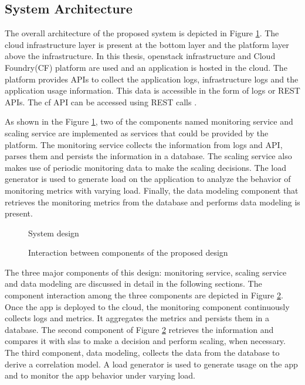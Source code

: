 \documentclass[article,type=msc,colorback,12pt,accentcolor=tud8b,table]{tudthesis}
\begin{document}
\subsection{System Architecture} 

	The overall architecture of the proposed system is depicted in Figure \ref{fig:system_design}. The cloud infrastructure layer is present at the bottom layer and the platform layer above the infrastructure. In this thesis, openstack infrastructure and Cloud Foundry(CF) platform are used and an application is hosted in the cloud. The platform provides APIs to collect the application logs, infrastructure logs and the application usage information. This data is accessible in the form of logs or REST APIs. The \gls{cf} API can be accessed using REST calls \cite{cf_summary}. 
	
	As shown in the Figure \ref{fig:system_design}, two of the components named monitoring service and scaling service are implemented as services that could be provided by the platform. The monitoring service collects the information from logs and API, parses them and persists the information in a database. The scaling service also makes use of periodic monitoring data to make the scaling decisions. The load generator is used to generate load on the application to analyze the behavior of monitoring metrics with varying load. Finally, the data modeling component that retrieves the monitoring metrics from the database and performs data modeling is present.

 			 \begin{figure}
 			 	\begin{center}
 			 	\end{center}
 			 	\caption{System design}
 			 	\label{fig:system_design}
 			 \end{figure}
 

 			 \begin{figure}
 			 	\begin{center}
 			 	\end{center}
 			 	\caption{Interaction between components of the proposed design}
 			 	\label{fig:system_component_interaction}
 			 \end{figure}

	The three major components of this design: monitoring service, scaling service and data modeling are discussed in detail in the following sections. The component interaction among the three components are depicted in Figure \ref{fig:system_component_interaction}. Once the app is deployed to the cloud, the monitoring component continuously collects logs and metrics. It aggregates the metrics and persists them in a database. The second component of Figure \ref{fig:system_component_interaction} retrieves the information and compares it with \gls{sla}s to make a decision and perform scaling, when necessary. The third component, data modeling, collects the data from the database to derive a correlation model. A load generator is used to generate usage on the app and to monitor the app behavior under varying load.
\end{document}

